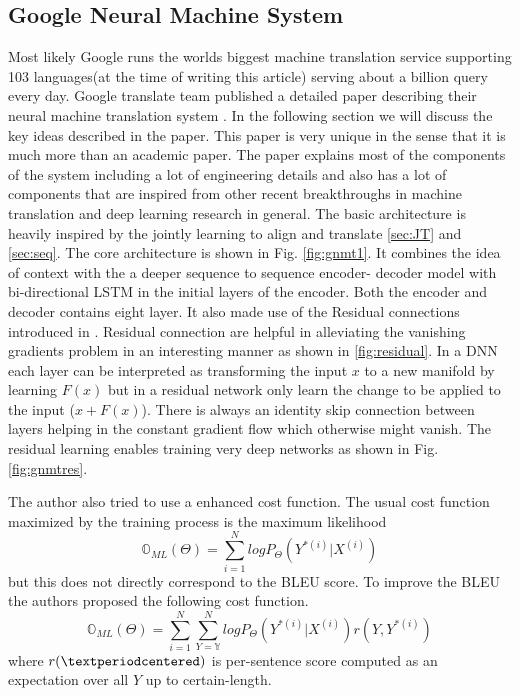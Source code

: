 \documentclass[a4paper]{article}
\begin{document}
\subsection{Google Neural Machine System}
Most  likely  Google  runs   the  worlds  biggest  machine  translation  service
supporting  103 languages(at the time of writing this article)  serving  about a
billion  query  every day. Google  translate  team  published  a  detailed paper
describing their neural machine translation  system \cite{wu2016google}. In  the
following section we  will discuss  the key  ideas described in the  paper. This
paper is  very unique in the sense that it is much more than an  academic paper.
The  paper explains  most of the components of  the  system  including a lot  of
engineering  details and  also has a lot  of  components  that are inspired from
other recent breakthroughs in machine translation and  deep learning research in
general.  The basic architecture is heavily inspired by the jointly  learning to
align and  translate  \ref{sec:JT}  and  \ref{sec:seq}. The core architecture is
shown in Fig. \ref{fig:gnmt1}. It combines the idea of context with the a deeper
sequence  to sequence  encoder- decoder  model with bi-directional LSTM  in  the
initial layers  of  the  encoder. Both  the  encoder  and decoder contains eight
layer.  It   also   made  use  of  the  Residual   connections   introduced   in
\cite{he2016deep}. Residual connection  are helpful in alleviating the vanishing
gradients problem in an interesting manner  as shown in \ref{fig:residual}. In a
DNN  each  layer  can  be  interpreted as transforming  the  input  $x$ to a new
manifold by learning  $F(x)$  but in a residual network only learn the change to
be  applied to  the  input  ($x  +  F(x)$).  There  is always an  identity  skip
connection between layers helping in the constant gradient  flow which otherwise
might vanish. The residual learning enables training very deep networks as shown
in Fig. \ref{fig:gnmtres}.

The author  also tried to use a enhanced  cost function. The usual cost function
maximized    by    the   training    process    is   the   maximum    likelihood
$$\mathbb{O}_{ML}(\Theta) = \sum_{i=1}^N log P_\Theta(Y^{*(i)} | X^{(i)}) $$ but
this does not directly correspond to  the BLEU score. To improve  the  BLEU  the
authors  proposed  the  following cost  function.  $$ \mathbb{O}_{ML}(\Theta)  =
\sum_{i=1}^N  \sum_{Y=\mathbb{Y}}^N   log  P_\Theta(Y^{*(i)}   |  X^{(i)})  r(Y,
Y^{*(i)} ) $$ where  $r(\textperiodcentered)$ is per-sentence score  computed as
an expectation over all $Y$ up to certain-length.
\end{document}
